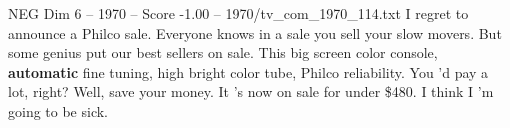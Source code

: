 \begin{textsample}{NEG Dim 6 – 1970 – Score -1.00 – 1970/tv\_com\_1970\_114.txt}  \label{ex:f6_neg_067}
I regret to announce a Philco sale.
Everyone knows in a sale you sell your slow movers.
But some genius put our best sellers on sale.
This big screen color console, \textbf{automatic} fine tuning, high bright color tube, Philco reliability.
You 'd pay a lot, right?
Well, save your money.
It 's now on sale for under \$480.
I think I 'm going to be sick.

\end{textsample}

